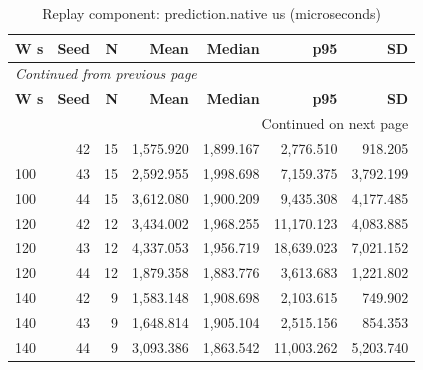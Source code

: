 \documentclass[10pt,a4paper]{article}
\begin{document}
\begin{longtable}{@{}lrrrrrr@{}}
\caption{Replay component:\allowbreak{} prediction.native us (microseconds)}\\
\toprule
\textbf{W s} & \textbf{Seed} & \textbf{N} & \textbf{Mean} & \textbf{Median} & \textbf{p95} & \textbf{SD} \\
\midrule\endfirsthead
\multicolumn{7}{l}{\small\itshape Continued from previous page}\\
\toprule
\textbf{W s} & \textbf{Seed} & \textbf{N} & \textbf{Mean} & \textbf{Median} & \textbf{p95} & \textbf{SD} \\
\midrule\endhead
\midrule\multicolumn{7}{r}{\small Continued on next page}\\\endfoot
\bottomrule\endlastfoot
100 & 42 & 15 & 1,575.920 & 1,899.167 & 2,776.510 & 918.205 \\
100 & 43 & 15 & 2,592.955 & 1,998.698 & 7,159.375 & 3,792.199 \\
100 & 44 & 15 & 3,612.080 & 1,900.209 & 9,435.308 & 4,177.485 \\
120 & 42 & 12 & 3,434.002 & 1,968.255 & 11,170.123 & 4,083.885 \\
120 & 43 & 12 & 4,337.053 & 1,956.719 & 18,639.023 & 7,021.152 \\
120 & 44 & 12 & 1,879.358 & 1,883.776 & 3,613.683 & 1,221.802 \\
140 & 42 & 9 & 1,583.148 & 1,908.698 & 2,103.615 & 749.902 \\
140 & 43 & 9 & 1,648.814 & 1,905.104 & 2,515.156 & 854.353 \\
140 & 44 & 9 & 3,093.386 & 1,863.542 & 11,003.262 & 5,203.740 \\
\end{longtable}\endgroup
\begingroup\small\setlength{\tabcolsep}{4pt}\renewcommand{\arraystretch}{1.12}
\end{document}
